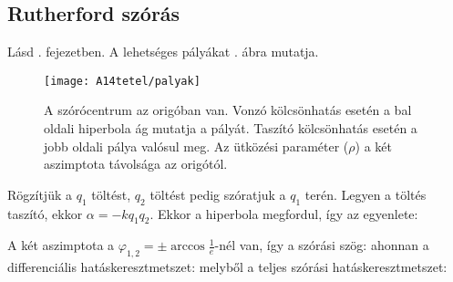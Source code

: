   \subsection{Rutherford szórás}
   
   Lásd . fejezetben.
   A lehetséges pályákat . ábra mutatja.
   
   \begin{figure}[ht!]
    \centering
    \texttt{[image: A14tetel/palyak]}
    \caption{A szórócentrum az origóban van.
   Vonzó kölcsönhatás esetén a bal oldali hiperbola ág mutatja a pályát.
   Taszító kölcsönhatás esetén a jobb oldali pálya valósul meg.
   Az ütközési paraméter ($\rho$) a két aszimptota távolsága az origótól.}\label{fig:A14-palyak}
   \end{figure}

   Rögzítjük a $q_1$ töltést, $q_2$ töltést pedig szóratjuk a $q_1$ terén.
   Legyen a töltés taszító, ekkor $\alpha=-k q_1 q_2$.
   Ekkor a hiperbola megfordul, így az egyenlete:
   
   A két aszimptota a $\varphi_{1,2}=\pm\arccos{\frac{1}{e}}$-nél van, így a szórási szög:
   ahonnan a differenciális hatáskeresztmetszet:
   melyből a teljes szórási hatáskeresztmetszet:
   
